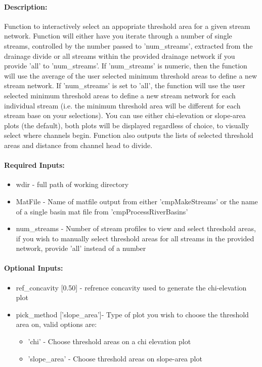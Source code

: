 \paragraph{Description:}
Function to interactively select an appopriate threshold area for a given stream
network. Function will either have you iterate through a number of single streams,
controlled by the number passed to 'num\_streams', extracted from the drainage divide or 
all streams within the provided drainage network if you provide 'all' to 'num\_streams'. 
If 'num\_streams' is numeric, then the function will use the average of the user selected 
minimum threshold areas to define a new stream network. If 'num\_streams' is set to 'all', the
function will use the user selected minimum threshold areas to define a new stream network for
each individual stream (i.e. the minimum threshold area will be different for each stream base
on your selections).  You can use either chi-elevation or slope-area plots (the default), both plots
will be displayed regardless of choice, to visually select where channels begin.  Function
also outputs the lists of selected threshold areas and distance from channel head to divide.

\paragraph{Required Inputs:}
\begin{itemize}
\item wdir - full path of working directory
\item MatFile - Name of matfile output from either 'cmpMakeStreams' or the name of a single basin mat file from 
'cmpProcessRiverBasins'
\item num\_streams - Number of stream profiles to view and select threshold areas, if you wish to manually 
select threshold areas for all streams in the provided network, provide 'all' instead of a number
\end{itemize}

\paragraph{Optional Inputs:}
\begin{itemize}
\item ref\_concavity [0.50] - refrence concavity used to generate the chi-elevation plot
\item pick\_method ['slope\_area']- Type of plot you wish to choose the threshold area on, valid options are:
\begin{itemize}
 \item 'chi' - Choose threshold areas on a chi elevation plot
\item 'slope\_area' - Choose threshold areas on slope-area plot
\end{itemize}
\end{itemize}

